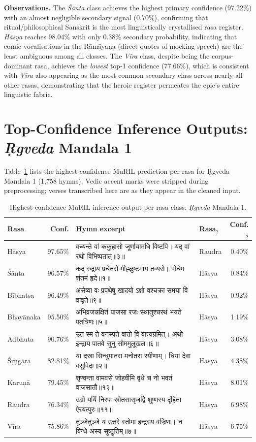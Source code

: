 \documentclass[11pt]{article}
\newcommand{\skt}[1]{{\devanagarifont #1}}
\newcommand{\skt}[1]{#1}
\begin{document}
\noindent\textbf{Observations.} The \textit{Ś\=anta} class achieves the highest primary confidence (97.22\%) with an almost negligible secondary signal (0.70\%), confirming that ritual/philosophical Sanskrit is the most linguistically crystallised rasa register. \textit{H\=asya} reaches 98.04\% with only 0.38\% secondary probability, indicating that comic vocalisations in the R\=am\=aya\d na (direct quotes of mocking speech) are the least ambiguous among all classes. The \textit{V\=ira} class, despite being the corpus-dominant rasa, achieves the \emph{lowest} top-1 confidence (77.66\%), which is consistent with \textit{V\=ira} also appearing as the most common secondary class across nearly all other rasas, demonstrating that the heroic register permeates the epic's entire linguistic fabric.

\section{Top-Confidence Inference Outputs: \textit{\d Rgveda} Mandala 1}
\label{sec:rigveda_top}

Table~\ref{tab:rigveda_top} lists the highest-confidence MuRIL prediction per rasa for \d Rgveda Mandala 1 (1,758 hymns). Vedic accent marks were stripped during preprocessing; verses transcribed here are as they appear in the cleaned input.

\begin{table}[htbp]
\centering
\small
\caption{Highest-confidence MuRIL inference output per rasa class: \textit{\d Rgveda} Mandala 1.}
\label{tab:rigveda_top}
\begin{tabular}{lrp{8.5cm}lr}
\toprule
Rasa & Conf. & Hymn excerpt & Rasa$_2$ & Conf.$_2$ \\
\midrule
H\=asya       & 97.65\% & \skt{वच्यन्ते वां ककुहासो जूर्णायामधि विष्टपि। यद् वां रथो विभिष्पतात्॥३॥} & Raudra & 0.40\% \\
Ś\=anta       & 96.57\% & \skt{कद् रुद्राय प्रचेतसे मीह्ळुष्टमाय तव्यसे। वोचेम शंतमं हृदे॥१॥} & H\=asya & 0.84\% \\
B\=ibhatsa    & 96.49\% & \skt{अंसेष्वा वः प्रपथेषु खादयो ऽक्षो वश्चक्रा समया वि वावृते॥९॥} & H\=asya & 0.92\% \\
Bhay\=anaka & 95.50\% & \skt{अभिव्रजन्नक्षितं पाजसा रजः स्थातुश्चरथं भयते पतत्रिणः॥५॥} & H\=asya & 1.19\% \\
Adbhuta      & 90.76\% & \skt{उत स्म ते वनस्पते वातो वि वात्यग्रमित्। अथो इन्द्राय पातवे सुनु सोममुलूखल॥६॥} & H\=asya & 3.08\% \\
Ś\d r\d ng\=ara & 82.81\% & \skt{या दस्रा सिन्धुमातरा मनोतरा रयीणाम्। धिया देवा वसुविदा॥२॥} & H\=asya & 4.38\% \\
Karu\d n\=a  & 79.45\% & \skt{शृण्वन्ता वामवसे जोहवीमि वृधे च नो भवतं वाजसातौ॥१२॥} & H\=asya & 8.01\% \\
Raudra       & 76.34\% & \skt{उग्रो ययिं निरपः स्रोतसासृजद्वि शुष्णस्य दृंहिता ऐरयत्पुरः॥११॥} & H\=asya & 6.98\% \\
V\=ira        & 75.86\% & \skt{तुञ्जेतुञ्जे य उत्तरे स्तोमा इन्द्रस्य वज्रिणः। न विन्धे अस्य सुष्टुतिम्॥७॥} & H\=asya & 6.75\% \\
\bottomrule
\end{tabular}
\end{table}
\end{document}
